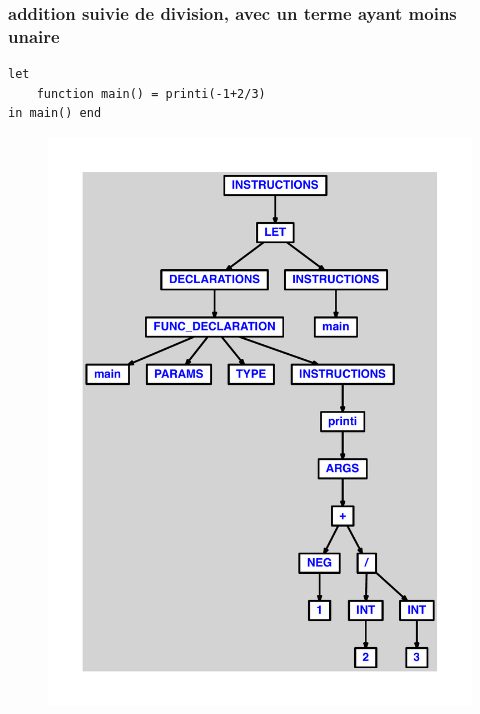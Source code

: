\documentclass{article}
\begin{document}
\subsubsection{addition suivie de division, avec un terme ayant moins unaire}
\begin{lstlisting}
let
	function main() = printi(-1+2/3)
in main() end
\end{lstlisting}
\newpage
\begin{figure}[H]
\centering
\includegraphics[max width=\textwidth]{ast/ast_70.pdf}
\end{figure}
\newpage
\end{document}
